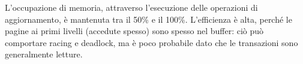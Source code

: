 L'occupazione di memoria, attraverso l'esecuzione delle operazioni di aggiornamento, è mantenuta tra il 50\% e il 100\%. L'efficienza è alta, perché le pagine ai primi livelli (accedute spesso) sono spesso nel buffer: ciò può comportare racing e deadlock, ma è poco probabile dato che le transazioni sono generalmente letture.






